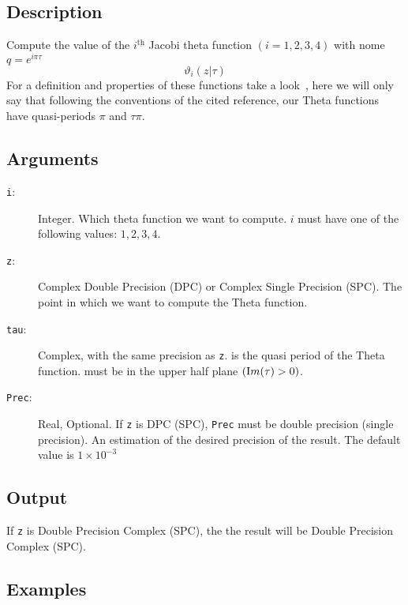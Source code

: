 \subsection{Description}

Compute the value of the $i^{\underline{\text{th}}}$ Jacobi theta
function $(i=1,2,3,4)$ with nome $q=e^{i\pi\tau}$ 
\begin{equation}
  \vartheta_i(z|\tau)
\end{equation}
For a definition and properties of these functions take a
look~\cite{ww:analysis}, here we will only say that following the
conventions of the cited reference, our Theta functions have
quasi-periods $\pi$ and $\tau\pi$. 

\subsection{Arguments}

\begin{description}
\item[\texttt{i}:] Integer. Which theta function we
  want to compute. $i$ must have one of the following values: $1,2,3,4$.
\item[\texttt{z}:] Complex Double Precision (DPC) or Complex Single
  Precision (SPC). The point in which we want to compute the Theta
  function.
\item[\texttt{tau}:] Complex, with the same precision as
  \texttt{z}. is the quasi period of the Theta function. must be in
  the upper half plane $(\textrm Im(\tau)> 0)$.
\item[\texttt{Prec}:] Real, Optional. If \texttt{z} is DPC (SPC),
  \texttt{Prec} must be double precision (single precision). An
  estimation of the desired precision of the result. The default value
  is $1\times 10^{-3}$
\end{description}

\subsection{Output}

If \texttt{z} is Double Precision Complex (SPC), the the result will be
Double Precision Complex (SPC).

\subsection{Examples}

